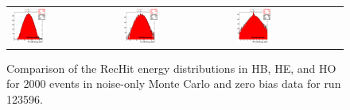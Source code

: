 \begin{figure}[h!]
 \centering
 \begin{tabular}{lll}
  \includegraphics[width=0.33\textwidth]{plots_CaloNoise/h_RecHitEinHB.eps} &
  \includegraphics[width=0.33\textwidth]{plots_CaloNoise/h_RecHitEinHE.eps} &
  \includegraphics[width=0.33\textwidth]{plots_CaloNoise/h_RecHitEinHO.eps} \\
 \end{tabular}
 \caption{\small Comparison of the RecHit energy distributions in HB, HE, and HO for 2000 events in noise-only Monte Carlo
          and zero bias data for run 123596.\label{fig:RecHitE}}
\end{figure}


